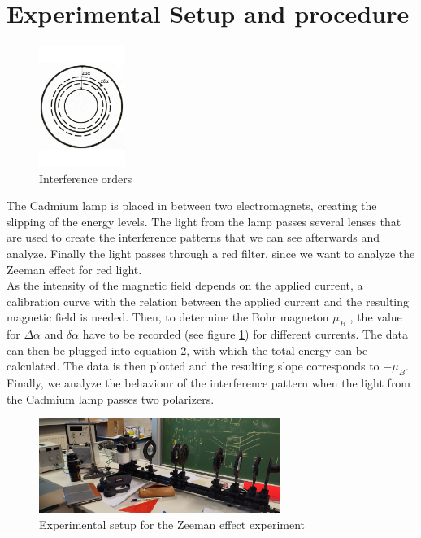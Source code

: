 \documentclass{scrartcl}
\begin{document}
\section{Experimental Setup and procedure}
\begin{figure}
    \centering
    \includegraphics[width=0.25\textwidth]{bilder/interference.pdf}
    \caption{Interference orders}
    \label{fig:delta_alpha}
\end{figure}
The Cadmium lamp is placed in between two electromagnets, creating the slipping of the energy levels. The light from the lamp passes several lenses that are used to create the interference patterns that we can see afterwards and analyze. Finally the light passes through a red filter, since we want to analyze the Zeeman effect for red light.\\
As the intensity of the magnetic field depends on the applied current, a calibration curve with the relation between the applied current and the resulting magnetic field is needed. Then, to determine the Bohr magneton $\mu_B$ , the value for $\Delta \alpha$ and $\delta \alpha$ have to be recorded (see figure \ref{fig:delta_alpha}) for different currents. The data can then be plugged into equation 2, with which the total energy can be calculated. The data is then plotted and the resulting slope corresponds to $-\mu_B$.\\
Finally, we analyze the behaviour of the interference pattern when the light from the Cadmium lamp passes two polarizers.
\begin{figure}[H]
    \centering
    \includegraphics[width=0.7\textwidth]{bilder/1652041363921.jpg}
    \caption{Experimental setup for the Zeeman effect experiment}
    \label{fig:Zeeman_setup}
\end{figure}
\end{document}
